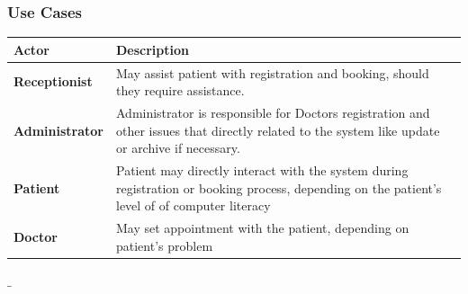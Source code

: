 \documentclass[11 pt]{article}
\begin{document}
    
    \subsubsection{Use Cases}
    
\begin{tabular}{|p{3cm}|p{9cm}|}
\hline
\textbf{Actor} & \textbf{Description}\\
\hline
\textbf{Receptionist} & May assist patient with registration and booking, should they require assistance.\\
\hline
\textbf{Administrator}& Administrator is responsible for Doctors registration and other issues that directly related to the system like update or archive if necessary.\\
\hline
\textbf{Patient}& Patient may directly interact with the system during registration or booking process, depending on the patient's level of of computer literacy\\
\hline
\textbf{Doctor}& May set appointment with the patient, depending on patient's problem \\
\hline

\end{tabular}
$\_$
\\\\\\
\end{document}
